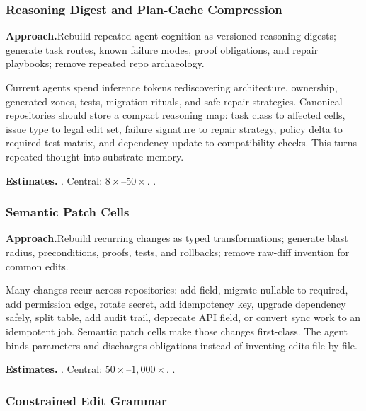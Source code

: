 \subsubsection{Reasoning Digest and Plan-Cache Compression}
\label{ssec:reasoning-digests}

\smallskip\noindent
\textbf{Approach.}\quad Rebuild repeated agent cognition as versioned reasoning digests; generate task routes, known failure modes, proof obligations, and repair playbooks; remove repeated repo archaeology.

Current agents spend inference tokens rediscovering architecture,
ownership, generated zones, tests, migration rituals, and safe repair
strategies.  Canonical repositories should store a compact reasoning
map: task class to affected cells, issue type to legal edit set, failure
signature to repair strategy, policy delta to required test matrix, and
dependency update to compatibility checks.  This turns repeated thought
into substrate memory.

\smallskip\noindent
\textbf{Estimates.}\quad
{}.\quad
Central: $8\times$--$50\times$.\quad
{}.

\subsubsection{Semantic Patch Cells}
\label{ssec:semantic-patch-cells}

\smallskip\noindent
\textbf{Approach.}\quad Rebuild recurring changes as typed transformations; generate blast radius, preconditions, proofs, tests, and rollbacks; remove raw-diff invention for common edits.

Many changes recur across repositories: add field, migrate nullable to
required, add permission edge, rotate secret, add idempotency key,
upgrade dependency safely, split table, add audit trail, deprecate API
field, or convert sync work to an idempotent job.  Semantic patch cells
make those changes first-class.  The agent binds parameters and
discharges obligations instead of inventing edits file by file.

\smallskip\noindent
\textbf{Estimates.}\quad
{}.\quad
Central: $50\times$--$1{,}000\times$.\quad
{}.

\subsubsection{Constrained Edit Grammar}
\label{ssec:constrained-edit-grammar}

